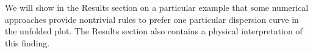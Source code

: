 We will show in the Results section on a particular example that some numerical approaches provide nontrivial rules to prefer one particular dispersion curve in the unfolded plot. The Results section also contains a physical interpretation of this finding.

% 

